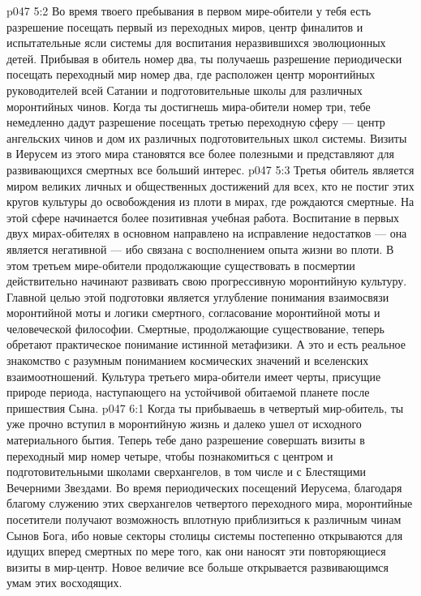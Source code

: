 \vs p047 5:2 Во время твоего пребывания в первом мире\hyp{}обители у тебя есть разрешение посещать первый из переходных миров, центр финалитов и испытательные ясли системы для воспитания неразвившихся эволюционных детей. Прибывая в обитель номер два, ты получаешь разрешение периодически посещать переходный мир номер два, где расположен центр моронтийных руководителей всей Сатании и подготовительные школы для различных моронтийных чинов. Когда ты достигнешь мира\hyp{}обители номер три, тебе немедленно дадут разрешение посещать третью переходную сферу --- центр ангельских чинов и дом их различных подготовительных школ системы. Визиты в Иерусем из этого мира становятся все более полезными и представляют для развивающихся смертных все больший интерес.
\vs p047 5:3 Третья обитель является миром великих личных и общественных достижений для всех, кто не постиг этих кругов культуры до освобождения из плоти в мирах, где рождаются смертные. На этой сфере начинается более позитивная учебная работа. Воспитание в первых двух мирах\hyp{}обителях в основном направлено на исправление недостатков --- она является негативной --- ибо связана с восполнением опыта жизни во плоти. В этом третьем мире\hyp{}обители продолжающие существовать в посмертии действительно начинают развивать свою прогрессивную моронтийную культуру. Главной целью этой подготовки является углубление понимания взаимосвязи моронтийной моты и логики смертного, согласование моронтийной моты и человеческой философии. Смертные, продолжающие существование, теперь обретают практическое понимание истинной метафизики. А это и есть реальное знакомство с разумным пониманием космических значений и вселенских взаимоотношений. Культура третьего мира\hyp{}обители имеет черты, присущие природе периода, наступающего на устойчивой обитаемой планете после пришествия Сына.
\vs p047 6:1 Когда ты прибываешь в четвертый мир\hyp{}обитель, ты уже прочно вступил в моронтийную жизнь и далеко ушел от исходного материального бытия. Теперь тебе дано разрешение совершать визиты в переходный мир номер четыре, чтобы познакомиться с центром и подготовительными школами сверхангелов, в том числе и с Блестящими Вечерними Звездами. Во время периодических посещений Иерусема, благодаря благому служению этих сверхангелов четвертого переходного мира, моронтийные посетители получают возможность вплотную приблизиться к различным чинам Сынов Бога, ибо новые секторы столицы системы постепенно открываются для идущих вперед смертных по мере того, как они наносят эти повторяющиеся визиты в мир\hyp{}центр. Новое величие все больше открывается развивающимся умам этих восходящих.
